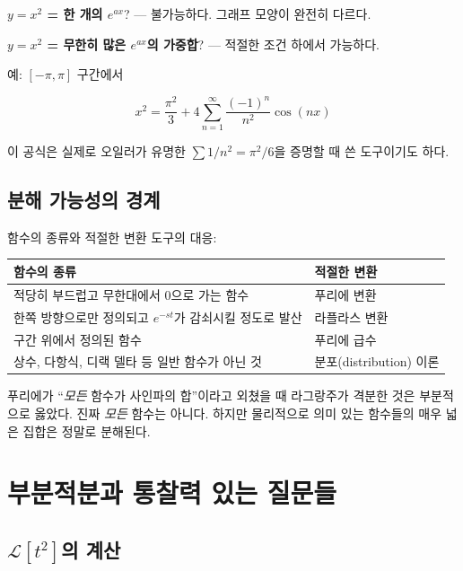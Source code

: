 \documentclass[11pt,a4paper]{article}
\begin{document}
\textbf{$y = x^2$ = 한 개의 $e^{ax}$}? --- 불가능하다. 그래프 모양이 완전히 다르다.

\textbf{$y = x^2$ = 무한히 많은 $e^{ax}$의 가중합}? --- 적절한 조건 하에서 가능하다.

예: $[-\pi, \pi]$ 구간에서

\begin{equation}
x^2 = \frac{\pi^2}{3} + 4\sum_{n=1}^{\infty} \frac{(-1)^n}{n^2}\cos(nx)
\end{equation}

이 공식은 실제로 오일러가 유명한 $\sum 1/n^2 = \pi^2/6$을 증명할 때 쓴 도구이기도 하다.

\subsection{분해 가능성의 경계}

함수의 종류와 적절한 변환 도구의 대응:

\begin{center}
\begin{tabular}{p{6cm}p{8cm}}
\toprule
함수의 종류 & 적절한 변환 \\
\midrule
적당히 부드럽고 무한대에서 0으로 가는 함수 & 푸리에 변환 \\
한쪽 방향으로만 정의되고 $e^{-st}$가 감쇠시킬 정도로 발산 & 라플라스 변환 \\
구간 위에서 정의된 함수 & 푸리에 급수 \\
상수, 다항식, 디랙 델타 등 일반 함수가 아닌 것 & 분포(distribution) 이론 \\
\bottomrule
\end{tabular}
\end{center}

푸리에가 ``\emph{모든} 함수가 사인파의 합''이라고 외쳤을 때 라그랑주가 격분한 것은 부분적으로 옳았다. 진짜 \emph{모든} 함수는 아니다. 하지만 물리적으로 의미 있는 함수들의 매우 넓은 집합은 정말로 분해된다.

\section{부분적분과 통찰력 있는 질문들}

\subsection{$\mathcal{L}[t^2]$의 계산}
\end{document}
